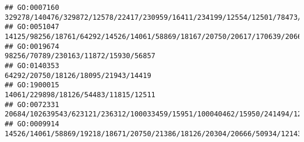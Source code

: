 \documentclass[
]{article}
\begin{document}
\begin{verbatim}
## GO:0007160                                                                                                                                                                                                                                                                                                                     329278/140476/329872/12578/22417/230959/16411/234199/12554/12501/78473/56838/16421/11815
## GO:0051047                                                                                                                                                                                                                                                                        14125/98256/18761/64292/14526/14061/58869/18167/20750/20617/170639/20666/107849/27062/12143/18095/21943/81799/22337/58226/14419/14126
## GO:0019674                                                                                                                                                                                                                                                                                                                                                                         98256/70789/230163/11872/15930/56857
## GO:0140353                                                                                                                                                                                                                                                                                                                                                                          64292/20750/18126/18095/21943/14419
## GO:1900015                                                                                                                                                                                                                                                                                                                                                                         14061/229898/18126/54483/11815/12511
## GO:0072331                                                                                                                                                                                                                                                                                                                             20684/102639543/623121/236312/100033459/15951/100040462/15950/241494/12578/16149
## GO:0009914                                                                                                                                                                                                                                                                               14526/14061/58869/19218/18671/20750/21386/18126/20304/20666/50934/12143/18095/21943/81799/116838/22337/14419/12780/11551/12229

\end{verbatim}
\end{document}
